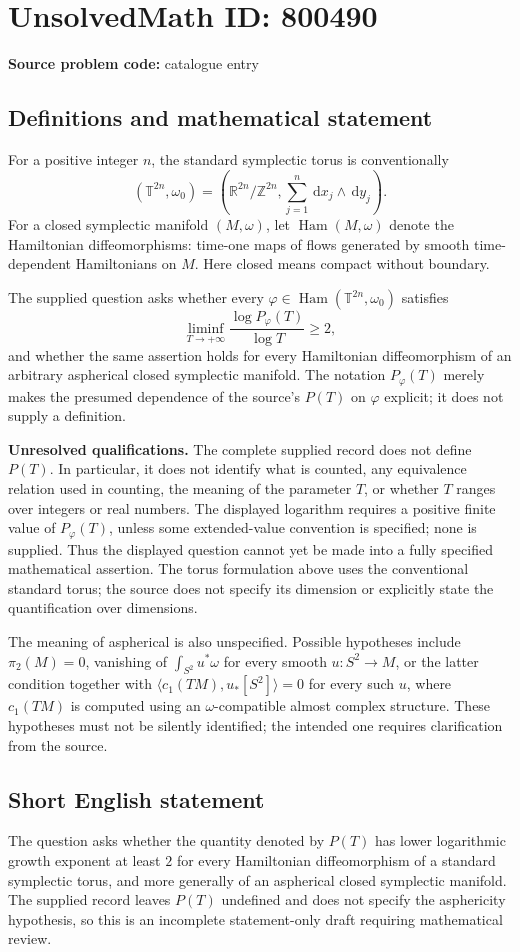 \documentclass[11pt]{article}
\newcommand{\Z}{\mathbb{Z}}
\newcommand{\R}{\mathbb{R}}
\newcommand{\dd}{\,\mathrm{d}}
\begin{document}
\section*{UnsolvedMath ID: 800490}
\textbf{Source problem code:} catalogue entry
\subsection{Definitions and mathematical statement}
For a positive integer \(n\), the standard symplectic torus is conventionally
\[
(\mathbb T^{2n},\omega_0)=\left(\R^{2n}/\Z^{2n},\sum_{j=1}^{n}\dd x_j\wedge\dd y_j\right).
\]
For a closed symplectic manifold \((M,\omega)\), let \(\operatorname{Ham}(M,\omega)\) denote the Hamiltonian diffeomorphisms: time-one maps of flows generated by smooth time-dependent Hamiltonians on \(M\). Here closed means compact without boundary.

The supplied question asks whether every \(\varphi\in\operatorname{Ham}(\mathbb T^{2n},\omega_0)\) satisfies
\[
\liminf_{T\to+\infty}\frac{\log P_\varphi(T)}{\log T}\geq 2,
\]
and whether the same assertion holds for every Hamiltonian diffeomorphism of an arbitrary aspherical closed symplectic manifold. The notation \(P_\varphi(T)\) merely makes the presumed dependence of the source's \(P(T)\) on \(\varphi\) explicit; it does not supply a definition.

\textbf{Unresolved qualifications.} The complete supplied record does not define \(P(T)\). In particular, it does not identify what is counted, any equivalence relation used in counting, the meaning of the parameter \(T\), or whether \(T\) ranges over integers or real numbers. The displayed logarithm requires a positive finite value of \(P_\varphi(T)\), unless some extended-value convention is specified; none is supplied. Thus the displayed question cannot yet be made into a fully specified mathematical assertion. The torus formulation above uses the conventional standard torus; the source does not specify its dimension or explicitly state the quantification over dimensions.

The meaning of aspherical is also unspecified. Possible hypotheses include \(\pi_2(M)=0\), vanishing of \(\int_{S^2}u^*\omega\) for every smooth \(u:S^2\to M\), or the latter condition together with \(\langle c_1(TM),u_*[S^2]\rangle=0\) for every such \(u\), where \(c_1(TM)\) is computed using an \(\omega\)-compatible almost complex structure. These hypotheses must not be silently identified; the intended one requires clarification from the source.
\subsection{Short English statement}
The question asks whether the quantity denoted by \(P(T)\) has lower logarithmic growth exponent at least \(2\) for every Hamiltonian diffeomorphism of a standard symplectic torus, and more generally of an aspherical closed symplectic manifold. The supplied record leaves \(P(T)\) undefined and does not specify the asphericity hypothesis, so this is an incomplete statement-only draft requiring mathematical review.
\end{document}

